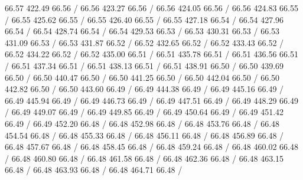 { 66.57 422.49 66.56 /
 66.56 423.27 66.56 /
 66.56 424.05 66.56 /
 66.56 424.83 66.55 /
 66.55 425.62 66.55 /
 66.55 426.40 66.55 /
 66.55 427.18 66.54 /
 66.54 427.96 66.54 /
 66.54 428.74 66.54 /
 66.54 429.53 66.53 /
 66.53 430.31 66.53 /
 66.53 431.09 66.53 /
 66.53 431.87 66.52 /
 66.52 432.65 66.52 /
 66.52 433.43 66.52 /
 66.52 434.22 66.52 /
 66.52 435.00 66.51 /
 66.51 435.78 66.51 /
 66.51 436.56 66.51 /
 66.51 437.34 66.51 /
 66.51 438.13 66.51 /
 66.51 438.91 66.50 /
 66.50 439.69 66.50 /
 66.50 440.47 66.50 /
 66.50 441.25 66.50 /
 66.50 442.04 66.50 /
 66.50 442.82 66.50 /
 66.50 443.60 66.49 /
 66.49 444.38 66.49 /
 66.49 445.16 66.49 /
 66.49 445.94 66.49 /
 66.49 446.73 66.49 /
 66.49 447.51 66.49 /
 66.49 448.29 66.49 /
 66.49 449.07 66.49 /
 66.49 449.85 66.49 /
 66.49 450.64 66.49 /
 66.49 451.42 66.49 /
 66.49 452.20 66.48 /
 66.48 452.98 66.48 /
 66.48 453.76 66.48 /
 66.48 454.54 66.48 /
 66.48 455.33 66.48 /
 66.48 456.11 66.48 /
 66.48 456.89 66.48 /
 66.48 457.67 66.48 /
 66.48 458.45 66.48 /
 66.48 459.24 66.48 /
 66.48 460.02 66.48 /
 66.48 460.80 66.48 /
 66.48 461.58 66.48 /
 66.48 462.36 66.48 /
 66.48 463.15 66.48 /
 66.48 463.93 66.48 /
 66.48 464.71 66.48 /
\endpicture
}
